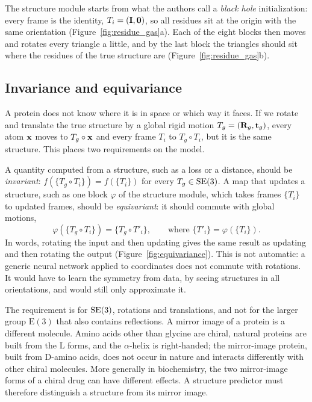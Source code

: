 The structure module starts from what the authors call a \emph{black hole} initialization: every frame is the identity, $T_i=(\mathbf{I},\mathbf{0})$, so all residues sit at the origin with the same orientation (Figure~\ref{fig:residue_gas}a). Each of the eight blocks then moves and rotates every triangle a little, and by the last block the triangles should sit where the residues of the true structure are (Figure~\ref{fig:residue_gas}b).

\subsection{Invariance and equivariance}

A protein does not know where it is in space or which way it faces. If we rotate and translate the true structure by a global rigid motion $T_g=(\mathbf{R}_g,\mathbf{t}_g)$, every atom $\mathbf{x}$ moves to $T_g\circ\mathbf{x}$ and every frame $T_i$ to $T_g\circ T_i$, but it is the same structure. This places two requirements on the model.

A quantity computed from a structure, such as a loss or a distance, should be \emph{invariant}: $f(\{T_g\circ T_i\})=f(\{T_i\})$ for every $T_g\in\mathrm{SE}(3)$. A map that updates a structure, such as one block $\varphi$ of the structure module, which takes frames $\{T_i\}$ to updated frames, should be \emph{equivariant}: it should commute with global motions,
\begin{equation}
  \varphi(\{T_g\circ T_i\}) = \{T_g\circ T'_i\}, \qquad\text{where } \{T'_i\}=\varphi(\{T_i\}).
  \label{eq:equivariance}
\end{equation}
In words, rotating the input and then updating gives the same result as updating and then rotating the output (Figure~\ref{fig:equivariance}). This is not automatic: a generic neural network applied to coordinates does not commute with rotations. It would have to learn the symmetry from data, by seeing structures in all orientations, and would still only approximate it.

The requirement is for $\mathrm{SE}(3)$, rotations and translations, and not for the larger group $\mathrm{E}(3)$ that also contains reflections. A mirror image of a protein is a different molecule. Amino acids other than glycine are chiral, natural proteins are built from the L forms, and the $\alpha$-helix is right-handed; the mirror-image protein, built from D-amino acids, does not occur in nature and interacts differently with other chiral molecules. More generally in biochemistry, the two mirror-image forms of a chiral drug can have different effects. A structure predictor must therefore distinguish a structure from its mirror image.

